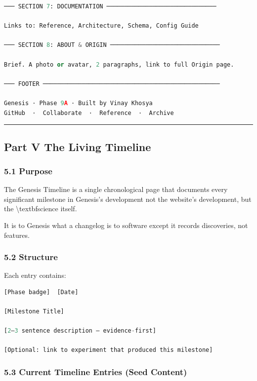 \documentclass[11pt,a4paper]{article}
\begin{document}
\begin{lstlisting}[language=Python]
─── SECTION 7: DOCUMENTATION ───────────────────────────────

Links to: Reference, Architecture, Schema, Config Guide

─── SECTION 8: ABOUT & ORIGIN ───────────────────────────────

Brief. A photo or avatar, 2 paragraphs, link to full Origin page.

─── FOOTER ──────────────────────────────────────────────────

Genesis · Phase 9A · Built by Vinay Khosya
GitHub  ·  Collaborate  ·  Reference  ·  Archive

\end{lstlisting}

\noindent\rule{\textwidth}{0.4pt}

\subsection*{Part V  The Living Timeline}

\subsubsection*{5.1 Purpose}

The Genesis Timeline is a single chronological page that documents every significant milestone in Genesis's development  not the website's development, but the \textbackslash{}textbf{science} itself.

It is to Genesis what a changelog is to software  except it records discoveries, not features.

\subsubsection*{5.2 Structure}

Each entry contains:

\begin{lstlisting}[language=Python]
[Phase badge]  [Date]

[Milestone Title]

[2–3 sentence description — evidence-first]

[Optional: link to experiment that produced this milestone]
\end{lstlisting}

\subsubsection*{5.3 Current Timeline Entries (Seed Content)}
\end{document}
